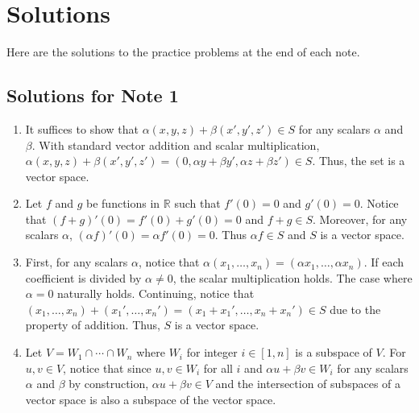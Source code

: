 \documentclass[../../main.tex]{subfiles}
\begin{document}
\chapter{Solutions}

Here are the solutions to the practice problems at the end of each
note.

\section{Solutions for Note 1}
\begin{enumerate}
\item
It suffices to show that $\alpha (x, y, z) + \beta (x', y', z') \in S$
for any scalars $\alpha$ and $\beta$. With standard vector addition
and scalar multiplication, $\alpha (x, y, z) + \beta (x', y', z') =
(0, \alpha y + \beta y', \alpha z + \beta z') \in S$. Thus, the set
is a vector space.

\item
Let $f$ and $g$ be functions in $\mathbb{R}$ such that $f'(0) = 0$
and $g'(0) = 0$. Notice that $(f + g)'(0) = f'(0) + g'(0) = 0$ and
$f + g \in S$. Moreover, for any scalars $\alpha$, $(\alpha f)'(0)
= \alpha f'(0) = 0$. Thus $\alpha f \in S$ and $S$ is a vector
space.

\item
First, for any scalars $\alpha$, notice that $\alpha(x_1, \ldots, x_n)
= (\alpha x_1, \ldots, \alpha x_n)$. If each coefficient is divided
by $\alpha \neq 0$, the scalar multiplication holds. The case where
$\alpha = 0$ naturally holds. Continuing, notice that $(x_1, \ldots,
x_n) + (x_1', \ldots, x_n') = (x_1 + x_1', \ldots, x_n + x_n') \in S$
due to the property of addition. Thus, $S$ is a vector space.

\item
Let $V = W_1 \cap \cdots \cap W_n$ where $W_i$ for integer $i \in
[1, n]$ is a subspace of $V$. For $u, v \in V$, notice that since
$u, v \in W_i$ for all $i$ and $\alpha u + \beta v \in W_i$ for any
scalars $\alpha$ and $\beta$ by construction, $\alpha u + \beta v \in
V$ and the intersection of subspaces of a vector space is also a
subspace of the vector space.


\end{enumerate}
\end{document}
